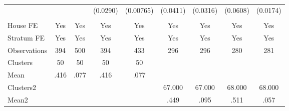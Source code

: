 {\begin{tabular}{l*{8}{c}}
                &         &         & (0.0290)&(0.00765)& (0.0411)& (0.0316)& (0.0608)& (0.0174)\\
                &         &         &         &         &         &         &         &         \\
House FE        &      Yes&      Yes&      Yes&      Yes&      Yes&      Yes&      Yes&      Yes\\
Stratum FE      &      Yes&      Yes&      Yes&      Yes&      Yes&      Yes&      Yes&      Yes\\
\midrule
Observations    &      394&      500&      394&      433&      296&      296&      280&      281\\
Clusters        &       50&       50&       50&       50&         &         &         &         \\
Mean            &     .416&     .077&     .416&     .077&         &         &         &         \\
Clusters2       &         &         &         &         &   67.000&   67.000&   68.000&   68.000\\
Mean2           &         &         &         &         &     .449&     .095&     .511&     .057\\
\bottomrule
\end{tabular}
}

